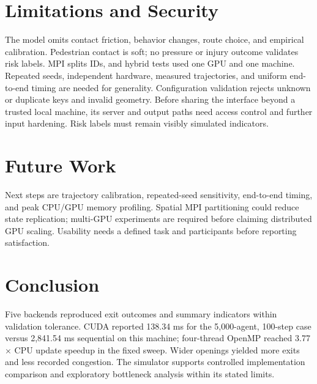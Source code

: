 \documentclass[conference]{IEEEtran}
\begin{document}
\section{Limitations and Security}
The model omits contact friction, behavior changes, route choice, and empirical calibration. Pedestrian contact is soft; no pressure or injury outcome validates risk labels. MPI splits IDs, and hybrid tests used one GPU and one machine. Repeated seeds, independent hardware, measured trajectories, and uniform end-to-end timing are needed for generality. Configuration validation rejects unknown or duplicate keys and invalid geometry. Before sharing the interface beyond a trusted local machine, its server and output paths need access control and further input hardening. Risk labels must remain visibly simulated indicators.

\section{Future Work}
Next steps are trajectory calibration, repeated-seed sensitivity, end-to-end timing, and peak CPU/GPU memory profiling. Spatial MPI partitioning could reduce state replication; multi-GPU experiments are required before claiming distributed GPU scaling. Usability needs a defined task and participants before reporting satisfaction.

\section{Conclusion}
Five backends reproduced exit outcomes and summary indicators within validation tolerance. CUDA reported 138.34 ms for the 5,000-agent, 100-step case versus 2,841.54 ms sequential on this machine; four-thread OpenMP reached 3.77$\times$ CPU update speedup in the fixed sweep. Wider openings yielded more exits and less recorded congestion. The simulator supports controlled implementation comparison and exploratory bottleneck analysis within its stated limits.
\end{document}
